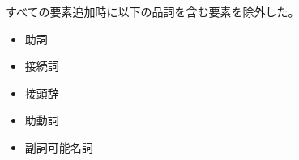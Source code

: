すべての要素追加時に以下の品詞を含む要素を除外した。
\begin{itemize}
    \item 助詞
    \item 接続詞
    \item 接頭辞
    \item 助動詞
    \item 副詞可能名詞
\end{itemize}
